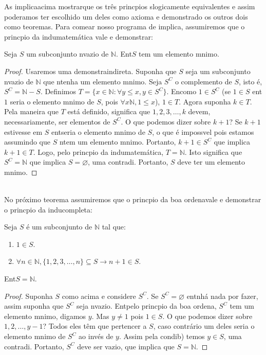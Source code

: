 As implica\coes acima mostrar\ao que os tr\^es princ\ih pios s\ao logicamente equivalentes e assim poder\ih amos ter escolhido um deles como axioma e demonstrado os outros dois como teoremas. Para come\cc ar nosso programa de implica\cois, assumiremos que o princ\ih pio da indu\cao matem\'atica vale e demonstrar:
\begin{teob}\label{indteo1}
Seja $S$ um subconjunto n\ao vazio de $\mathbb{N}$. Ent\ao $S$ tem um elemento m\ih nimo.
\end{teob}
\begin{proof}
Usaremos uma demonstra\cao indireta. Suponha que $S$ seja um subconjunto n\ao vazio de $\mathbb{N}$ que n\ao tenha um elemento m\ih nimo. Seja $S^C$ o complemento de $S$, isto \'e, $S^C=\mathbb{N}-S$. Definimos $T=\{x\in\mathbb{N}: \forall y\leq x, y\in S^C\}$. En\tao como $1\in S^C$ (se $1\in S$ ent\ao $1$ seria o elemento m\ih nimo de $S$, pois $\forall x\mathbb{N}, 1\leq x$), $1\in T$. Agora suponha $k\in T$. Pela maneira que $T$ est\'a definido, significa que $1,2,3,\ldots,k$ devem, necessariamente, ser elementos de $S^C$. O que podemos dizer sobre $k+1$? Se $k+1$ estivesse em $S$ ent\ao seria o elemento m\ih nimo de $S$, o que \'e imposs\ih vel pois estamos assumindo que $S$ n\ao tem um elemento m\ih nimo. Portanto, $k+1\in S^C$ que implica $k+1\in T$. Logo, pelo princ\ih pio da indu\cao matem\'atica, $T=\mathbb{N}$. Isto significa que $S^C=\mathbb{N}$ que implica $S=\varnothing$, uma contradi\caoi. Portanto, $S$ deve ter um elemento m\ih nimo. 
\end{proof}
\\

No pr\'oximo teorema assumiremos que o princ\ih pio da boa ordena\cao vale e demonstrar o princ\ih pio da indu\cao completa:
\begin{teob}\label{indteo2}
Seja $S$ \'e um subconjunto de $\mathbb{N}$ tal que:
\begin{enumerate}[{\bf a)}]
\item $1\in S$.
\item $\forall n\in \mathbb{N}, \{1,2,3,\ldots,n\}\subseteq S \rightarrow n+1\in S$. 
\end{enumerate}
Ent\ao $S=\mathbb{N}$. 
\\
\end{teob}
\begin{proof}
Suponha $S$ como acima e considere $S^C$. Se $S^C=\varnothing$ ent\ao n\ao h\'a nada por fazer, assim suponha que $S^C$ seja n\ao vazio. Ent\ao pelo princ\ih pio da boa ordena\caoi, $S^C$ tem um elemento m\ih nimo, digamos $y$. Mas $y\neq 1$ pois $1\in S$. O que podemos dizer sobre $1,2,\ldots,y-1$? Todos eles t\^em que pertencer a $S$, caso contr\'ario um deles seria o elemento m\ih nimo de $S^C$ ao inv\'es de $y$. Assim pela condi\cao b) temos $y\in S$, uma contradi\caoi. Portanto, $S^C$ deve ser vazio, que implica que $S=\mathbb{N}$.
\end{proof}
\\

